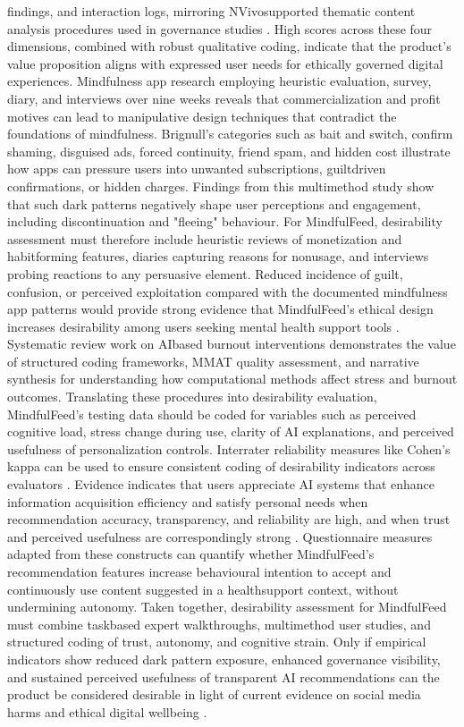 \documentclass{article}
\begin{document}
findings, and interaction logs, mirroring NVivo\-supported thematic content analysis procedures used in governance studies \parencites[7808872]{7808872}. High scores across these four dimensions, combined with robust qualitative coding, indicate that the product's value proposition aligns with expressed user needs for ethically governed digital experiences. Mindfulness app research employing heuristic evaluation, survey, diary, and interviews over nine weeks reveals that commercialization and profit motives can lead to manipulative design techniques that contradict the foundations of mindfulness. Brignull's categories such as bait and switch, confirm shaming, disguised ads, forced continuity, friend spam, and hidden cost illustrate how apps can pressure users into unwanted subscriptions, guilt\-driven confirmations, or hidden charges. Findings from this multi\-method study show that such dark patterns negatively shape user perceptions and engagement, including discontinuation and "fleeing" behaviour. For MindfulFeed, desirability assessment must therefore include heuristic reviews of monetization and habit\-forming features, diaries capturing reasons for non\-usage, and interviews probing reactions to any persuasive element. Reduced incidence of guilt, confusion, or perceived exploitation compared with the documented mindfulness app patterns would provide strong evidence that MindfulFeed's ethical design increases desirability among users seeking mental health support tools \parencites[2]{7173856}. Systematic review work on AI\-based burnout interventions demonstrates the value of structured coding frameworks, MMAT quality assessment, and narrative synthesis for understanding how computational methods affect stress and burnout outcomes. Translating these procedures into desirability evaluation, MindfulFeed's testing data should be coded for variables such as perceived cognitive load, stress change during use, clarity of AI explanations, and perceived usefulness of personalization controls. Inter\-rater reliability measures like Cohen's kappa can be used to ensure consistent coding of desirability indicators across evaluators \parencites[19]{8760542}. Evidence indicates that users appreciate AI systems that enhance information acquisition efficiency and satisfy personal needs when recommendation accuracy, transparency, and reliability are high, and when trust and perceived usefulness are correspondingly strong \parencites[6]{6103768}. Questionnaire measures adapted from these constructs can quantify whether MindfulFeed's recommendation features increase behavioural intention to accept and continuously use content suggested in a health\-support context, without undermining autonomy. Taken together, desirability assessment for MindfulFeed must combine task\-based expert walkthroughs, multi\-method user studies, and structured coding of trust, autonomy, and cognitive strain. Only if empirical indicators show reduced dark pattern exposure, enhanced governance visibility, and sustained perceived usefulness of transparent AI recommendations can the product be considered desirable in light of current evidence on social media harms and ethical digital well\-being \parencites[2]{4807303}[3]{4692551}[7808872]{7808872}[6]{6103768}.
\end{document}
